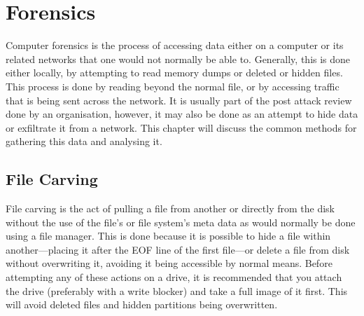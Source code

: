 \chapter{Forensics}
	\label{ch:Forensics}
	Computer forensics is the process of accessing data either on a computer or its related networks that one would not normally be able to. 
	Generally, this is done either locally, by attempting to read memory dumps or deleted or hidden files. 
	This process is done by reading beyond the normal file, or by accessing traffic that is being sent across the network. 
	It is usually part of the post attack review done by an organisation, however, it may also be done as an attempt to hide data or exfiltrate it from a network. 
	This chapter will discuss the common methods for gathering this data and analysing it. 
	
	\section{File Carving}
		File carving is the act of pulling a file from another or directly from the disk without the use of the file's or file system's meta data as would normally be done using a file manager. 
		This is done because it is possible to hide a file within another---placing it after the EOF line of the first file---or delete a file from disk without overwriting it, avoiding it being accessible by normal means. 
		Before attempting any of these actions on a drive, it is recommended that you attach the drive (preferably with a write blocker) and take a full image of it first. 
		This will avoid deleted files and hidden partitions being overwritten. 

